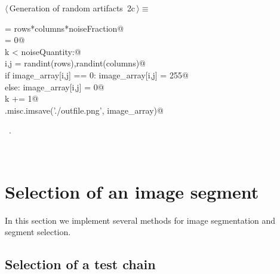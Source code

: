\documentclass[11pt,oneside]{article}	%
\begin{document}
\begin{flushleft} \small
\begin{minipage}{\linewidth} \label{scrap3}
\protect{}$\langle\,$Generation of random artifacts\nobreak\ {\footnotesize 2c}$\,\rangle\equiv$
\vspace{-1ex}
\begin{list}{}{} \item
\mbox{}\verb@noiseQuantity = rows*columns*noiseFraction@\\
\mbox{}\verb@k = 0@\\
\mbox{}\verb@while k < noiseQuantity:@\\
\mbox{}\verb@   i,j = randint(rows),randint(columns)@\\
\mbox{}\verb@   if image_array[i,j] == 0: image_array[i,j] = 255@\\
\mbox{}\verb@   else: image_array[i,j] = 0@\\
\mbox{}\verb@   k += 1@\\
\mbox{}\verb@scipy.misc.imsave('./outfile.png', image_array)@\\
\mbox{}\verb@@{\NWsep}
\end{list}
\vspace{-1ex}
\footnotesize\addtolength{\baselineskip}{-1ex}
\begin{list}{}{\setlength{\itemsep}{-\parsep}\setlength{\itemindent}{-\leftmargin}}
\item \NWtxtMacroRefIn\ .
\end{list}
\end{minipage}\\[4ex]
\end{flushleft}


\section{Selection of an image segment}

In this section we implement several methods for image segmentation and segment selection. 

\subsection{Selection of a test chain}
\end{document}

